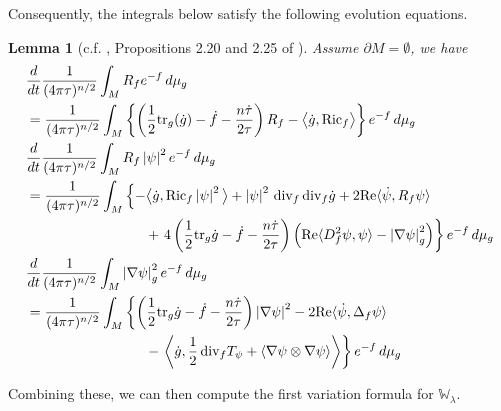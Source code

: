 \documentclass{amsart}
\newtheorem{lemma}[theorem]{Lemma}
\theoremstyle{definition}
\theoremstyle{remark}
\numberwithin{equation}{section}
\newcommand{\abs}[1]{\left|#1\right|}
\newcommand{\tr}{\textup{tr}}
\newcommand{\Ric}{\textup{Ric}}
\renewcommand{\div}{\,\textup{div}}
\begin{document}
Consequently, the integrals below satisfy the following evolution equations.
\begin{lemma}[c.f. \cite{AWW}, Propositions 2.20 and 2.25 of \cite{BO23}]
\label{lma:integral_variations}
Assume $\partial M = \emptyset$, we have
\begin{align}
\label{eq:ev_R_f} & \frac{d}{dt}\frac{1}{(4\pi\tau)^{n/2}}\int_M R_f e^{-f}\,d\mu_g\\
 & = \frac{1}{(4\pi\tau)^{n/2}}\int_M \left\{\left(\frac{1}{2}\tr_g(\dot{g}) - \dot{f} - \frac{n\dot\tau}{2\tau}\right)R_f -\big\langle \dot{g}, \Ric_f \big\rangle\right\} e^{-f}\,d\mu_g \nonumber\\
\label{eq:ev_R_f|psi|^2} & \frac{d}{dt}\frac{1}{(4\pi\tau)^{n/2}}\int_M R_f \abs{\psi}^2 e^{-f}\,d\mu_g\\
& = \frac{1}{(4\pi\tau)^{n/2}}\int_M \left\{-\big\langle \dot{g}, \Ric_f \abs{\psi}^2\big\rangle + \abs{\psi}^2 \div_f\div_f \dot{g} + 2\textup{Re}\langle \dot\psi, R_f\psi\rangle\right. \nonumber\\
& \hskip 3cm + \left.4\left(\frac{1}{2}\tr_g\dot{g} - \dot{f} - \frac{n\dot\tau}{2\tau}\right)\left(\textup{Re}\langle D_f^2\psi,\psi\rangle - \abs{\nabla\psi}^2_g\right)\right\} e^{-f}\,d\mu_g\nonumber\\
\label{eq:ev_|nabla_psi|^2} & \frac{d}{dt}\frac{1}{(4\pi\tau)^{n/2}}\int_M \abs{\nabla\psi}_g^2 e^{-f}\,d\mu_g \\
& = \frac{1}{(4\pi\tau)^{n/2}}\int_M \left\{\left(\frac{1}{2}\tr_g\dot{g} - \dot{f} - \frac{n\dot\tau}{2\tau}\right) \abs{\nabla\psi}^2 - 2\textup{Re} \langle\dot\psi, \Delta_f\psi\rangle\right. \nonumber\\
& \hskip 3cm - \left.\left\langle \dot{g}, \frac{1}{2}\div_f T_\psi + \langle \nabla\psi \otimes \nabla\psi\rangle\right\rangle \right\}e^{-f}\,d\mu_g\nonumber
\end{align}
\end{lemma}
Combining these, we can then compute the first variation formula for $\mathbb{W}_\lambda$.
\end{document}
